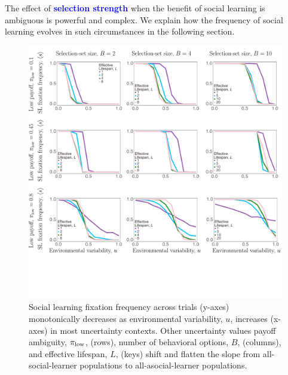 \documentclass[letterpaper,11.5pt]{scrartcl}
\newcommand{\cm}[1]{{\textcolor{mypurple} {({\tiny CM:} #1)}}}
\newcommand{\edit}[1]{{\bfseries \textcolor{blue} {#1}}}
\begin{document}
The effect of \edit{selection strength} when the benefit of social learning is ambiguous is powerful and complex. We explain how the frequency of social learning evolves in such circumstances in the following section.



\begin{figure}
  \caption{Social learning fixation frequency across trials (y-axes) monotonically decreases as 
  environmental variability, $u$, increases (x-axes) in most uncertainty contexts. 
  Other uncertainty values payoff ambiguity, $\pi_{\mathrm{low}}$, (rows), number of behavioral options, $B$, (columns), and effective lifespan, $L$, (keys) shift and flatten the slope from all-social-learner populations to all-asocial-learner
  populations.}
  \label{fig:mainResults}
  \centering
    \includegraphics[width=\textwidth]{Figures/mainResultsPlots.pdf}
\end{figure}
\end{document}
